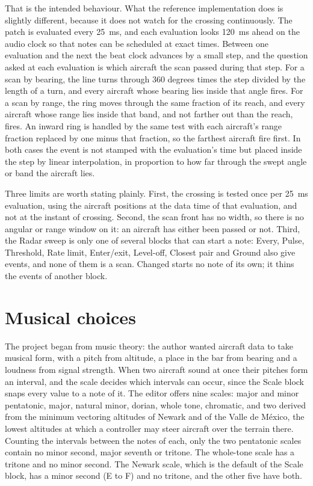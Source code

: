 \documentclass[11pt,letterpaper]{article}
\begin{document}
That is the intended behaviour. What the reference implementation does is slightly different, because it does not watch for the crossing continuously. The patch is evaluated every 25~ms, and each evaluation looks 120~ms ahead on the audio clock so that notes can be scheduled at exact times. Between one evaluation and the next the beat clock advances by a small step, and the question asked at each evaluation is which aircraft the scan passed during that step. For a scan by bearing, the line turns through $360$ degrees times the step divided by the length of a turn, and every aircraft whose bearing lies inside that angle fires. For a scan by range, the ring moves through the same fraction of its reach, and every aircraft whose range lies inside that band, and not farther out than the reach, fires. An inward ring is handled by the same test with each aircraft's range fraction replaced by one minus that fraction, so the farthest aircraft fire first. In both cases the event is not stamped with the evaluation's time but placed inside the step by linear interpolation, in proportion to how far through the swept angle or band the aircraft lies.

Three limits are worth stating plainly. First, the crossing is tested once per 25~ms evaluation, using the aircraft positions at the data time of that evaluation, and not at the instant of crossing. Second, the scan front has no width, so there is no angular or range window on it: an aircraft has either been passed or not. Third, the Radar sweep is only one of several blocks that can start a note: Every, Pulse, Threshold, Rate limit, Enter/exit, Level-off, Closest pair and Ground also give events, and none of them is a scan. Changed starts no note of its own; it thins the events of another block.

\section{Musical choices}\label{sec:music}

The project began from music theory: the author wanted aircraft data to take musical form, with a pitch from altitude, a place in the bar from bearing and a loudness from signal strength. When two aircraft sound at once their pitches form an interval, and the scale decides which intervals can occur, since the Scale block snaps every value to a note of it. The editor offers nine scales: major and minor pentatonic, major, natural minor, dorian, whole tone, chromatic, and two derived from the minimum vectoring altitudes of Newark and of the Valle de M\'exico, the lowest altitudes at which a controller may steer aircraft over the terrain there. Counting the intervals between the notes of each, only the two pentatonic scales contain no minor second, major seventh or tritone. The whole-tone scale has a tritone and no minor second. The Newark scale, which is the default of the Scale block, has a minor second (E to F) and no tritone, and the other five have both.
\end{document}
